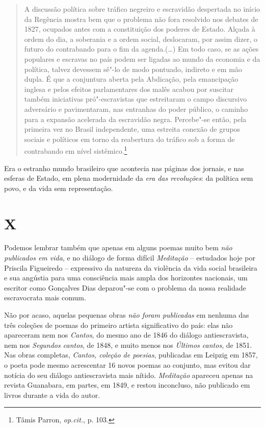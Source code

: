\begin{quote}
A discussão política sobre tráfico negreiro e escravidão despertada no
início da Regência mostra bem que o problema não fora resolvido nos
debates de 1827, ocupados antes com a constituição dos poderes de
Estado. Alçada à ordem do dia, a soberania e a ordem social, deslocaram,
por assim dizer, o futuro do contrabando para o fim da agenda.(\ldots{}) Em
todo caso, se as ações populares e escravas no país podem ser ligadas ao
mundo da economia e da política, talvez devessem sê"-lo de modo pontuado,
indireto e em mão dupla. É que a conjuntura aberta pela Abdicação, pela
emancipação inglesa e pelos efeitos parlamentares dos malês acabou por
suscitar também iniciativas pró"-escravistas que estreitaram o campo
discursivo adversário e pavimentaram, nas entranhas do poder público, o
caminho para a expansão acelerada da escravidão negra. Percebe"-se então,
pela primeira vez no Brasil independente, uma estreita conexão de grupos
sociais e políticos em torno da reabertura do tráfico sob a forma de
contrabando em nível sistêmico.\footnote{Tâmis Parron, \emph{op.cit.},
  p. 103.}
\end{quote}

Era o estranho mundo brasileiro que acontecia nas páginas dos jornais, e
nas esferas de Estado, em plena modernidade da \emph{era das
revoluções}: da política sem povo, e da vida sem representação.

\section{X}

Podemos lembrar também que apenas em alguns poemas muito bem \emph{não
publicados em vida}, e no diálogo de forma difícil \emph{Meditação} --
estudados hoje por Priscila Figueiredo -- expressivo da natureza da
violência da vida social brasileira e sua angústia para uma consciência
mais ampla dos horizontes nacionais, um escritor como Gonçalves Dias
deparou"-se com o problema da nossa realidade escravocrata mais comum.

Não por acaso, aquelas pequenas obras \emph{não foram publicadas} em
nenhuma das três coleções de poemas do primeiro artista significativo do
país: elas não apareceram nem nos \emph{Cantos}, do mesmo ano de 1846 do
diálogo antiescravista, nem nos \emph{Segundos cantos}, de 1848, e muito
menos nos \emph{Últimos cantos}, de 1851. Nas obras completas,
\emph{Cantos, coleção de poesias}, publicadas em Leipzig em 1857, o
poeta pode mesmo acrescentar 16 novos poemas ao conjunto, mas evitou dar
notícia do seu diálogo antiescravista mais nítido. \emph{Meditação}
apareceu apenas na revista Guanabara, em partes, em 1849, e restou
inconcluso, não publicado em livros durante a vida do autor.

